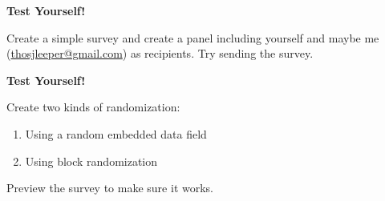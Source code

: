 \bgroup
{}
\begin{frame}[plain]{}
\begin{center}
\textbf{{\Large Test Yourself!}}

\vspace{2em}

Create a simple survey and create a panel including yourself and maybe me (\href{mailto:thosjleeper@gmail.com}{thosjleeper@gmail.com}) as recipients. Try sending the survey.

\end{center}
\end{frame}
\egroup




\bgroup
{}
\begin{frame}[plain]{}
\begin{center}
\textbf{{\Large Test Yourself!}}
\end{center}

\vspace{2em}

Create two kinds of randomization: 

\begin{enumerate}
\item Using a random embedded data field
\item Using block randomization
\end{enumerate}

Preview the survey to make sure it works.

\end{frame}
\egroup




